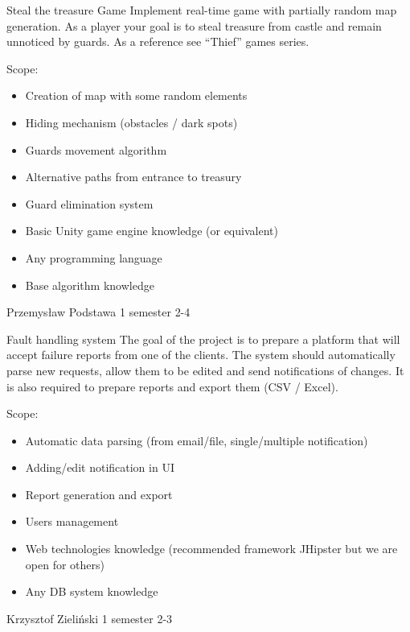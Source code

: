 \begin{project}
{Steal the treasure Game}
{Implement real-time game with partially random map generation. As a player your goal is to steal treasure from castle and remain unnoticed by guards. As a reference see “Thief” games series.} 
{
Scope:
\begin{itemize}
	\item Creation of map with some random elements
	\item Hiding mechanism (obstacles / dark spots)
	\item Guards movement algorithm
	\item Alternative paths from entrance to treasury
	\item Guard elimination system
\end{itemize}
}
{
\begin{itemize}
	\item Basic Unity game engine knowledge (or equivalent)
	\item Any programming language
	\item Base algorithm knowledge
\end{itemize}
}
{Przemysław Podstawa}
{1 semester}
{2-4}
\end{project}
\begin{project}
{Fault handling system}
{The goal of the project is to prepare a platform that will accept failure reports from one of the clients. The system should automatically parse new requests, allow them to be edited and send notifications of changes. It is also required to prepare reports and export them (CSV / Excel).} 
{
Scope:
\begin{itemize}
	\item Automatic data parsing (from email/file, single/multiple notification)
	\item Adding/edit notification in UI
	\item Report generation and export
	\item Users management
\end{itemize}
}
{
\begin{itemize}
	\item Web technologies knowledge (recommended framework JHipster but we are open for others)
	\item Any DB system knowledge
\end{itemize}
}
{Krzysztof Zieliński}
{1 semester}
{2-3}
\end{project}
